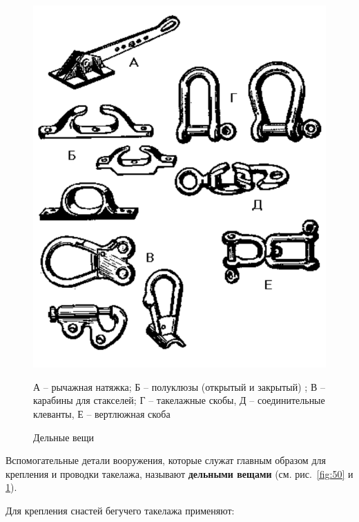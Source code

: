\documentclass[a4paper, 12pt, twoside, final]{scrbook}
\begin{document}
\begin{figure}[htbp]
\begin{centering}
\includegraphics{Delnye_veschi}
\par\end{centering}

\protect\caption{\label{fig:51}Дельные вещи}

\begin{centering} \small
А \--- рычажная натяжка; Б \--- полуклюзы (открытый и закрытый) ; В \--- карабины
для стакселей; Г \--- такелажные скобы, Д \--- соединительные клеванты,
Е \--- вертлюжная скоба
\par\end{centering}

\end{figure}

Вспомогательные детали вооружения, которые служат главным образом для крепления и проводки такелажа, называют \textbf{дельными вещами} (см. рис.~\ref{fig:50} и \ref{fig:51}).

Для крепления снастей бегучего такелажа применяют:
\end{document}
